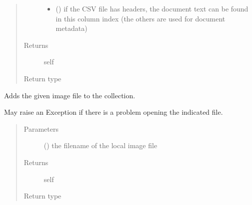 \documentclass[letterpaper,10pt,english]{sphinxmanual}
\begin{document}
\begin{fulllineitems}
\begin{fulllineitems}
\begin{quote}
\begin{description}
\begin{itemize}
\item {} 
 () \textendash{} if the CSV file has headers, the document text can be found in this column index
(the others are used for document metadata)

\end{itemize}

\item[{Returns}] \leavevmode
self

\item[{Return type}] \leavevmode
{\hyperref[\detokenize{autoapi/pine/client/models/index:pine.client.models.CollectionBuilder}]{}}

\end{description}\end{quote}

\end{fulllineitems}


\begin{fulllineitems}
\label{\detokenize{autoapi/pine/client/models/index:pine.client.models.CollectionBuilder.image_file}}
Adds the given image file to the collection.

May raise an Exception if there is a problem opening the indicated file.
\begin{quote}\begin{description}
\item[{Parameters}] \leavevmode
{} () \textendash{} the filename of the local image file

\item[{Returns}] \leavevmode
self

\item[{Return type}] \leavevmode
{\hyperref[\detokenize{autoapi/pine/client/models/index:pine.client.models.CollectionBuilder}]{}}


\end{description}
\end{quote}
\end{fulllineitems}
\end{fulllineitems}
\end{document}
